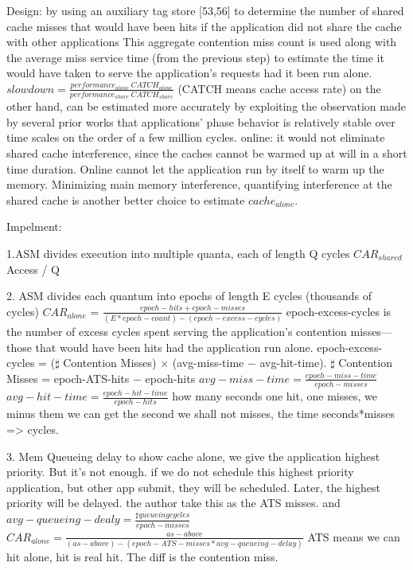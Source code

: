 \documentclass[UTF8]{article}
\begin{document}
Design: by using an auxiliary tag store [53,56] to determine the number of shared cache misses that would have been hits if the application did not share the cache with other applications This aggregate contention miss count is used along with the average miss service time (from the previous step) to estimate the time it would have taken to serve the application’s requests had it been run alone.   $slowdown = \frac{performance_{alone} ~ CATCH_{alone}}{performance_{share} ~ CATCH_{share}}$ (CATCH means cache access rate) on the other hand, can be estimated more accurately by exploiting the observation made by several prior works that applications’ phase behavior is relatively stable over time scales on the order of a few million cycles.   online: it would not eliminate shared cache interference, since the caches cannot be warmed up at will in a short time duration.  Online cannot let the application run by itself to warm up the memory. Minimizing main memory interference, quantifying interference at the shared cache is another better choice to estimate $cache_{alone}$. 

Impelment: 

1.ASM divides execution into multiple quanta, each of length Q cycles $ CAR_{shared}$ Access / Q 

2. ASM divides each quantum into epochs of length E cycles (thousands of cycles)  $CAR_{alone}$   = $\frac{epoch-hits + epoch-misses}{(E*epoch-count) - (epoch-excess-cycles)}$   epoch-excess-cycles is the number of excess cycles spent serving the application’s contention misses—those that would have been hits had the application run alone.  epoch-excess-cycles = ($\sharp$ Contention Misses) × (avg-miss-time − avg-hit-time). $\sharp$ Contention Misses = epoch-ATS-hits − epoch-hits $avg-miss-time = \frac{epoch-miss-time}{epoch-misses}$ $avg-hit-time = \frac{epoch-hit-time}{epoch-hits}$ how many seconds one hit, one misses, we minus them we can get the second we shall not misses, the time seconds*misses => cycles. 

3. Mem Queueing delay to show cache alone, we give the application highest priority. But it's not enough. if we do not schedule this highest priority application, but other app submit, they will be scheduled. Later, the highest priority will be delayed. the author take this as the ATS misses. and $avg-queueing-dealy = \frac{\sharp queueing cycles}{epoch-misses}$ $CAR_{alone} = \frac{as-above}{(as-above) - (epoch-ATS-misses*avg-queueing-delay)}$ ATS means we can hit alone, hit is real hit. The diff is the contention miss.
\end{document}
